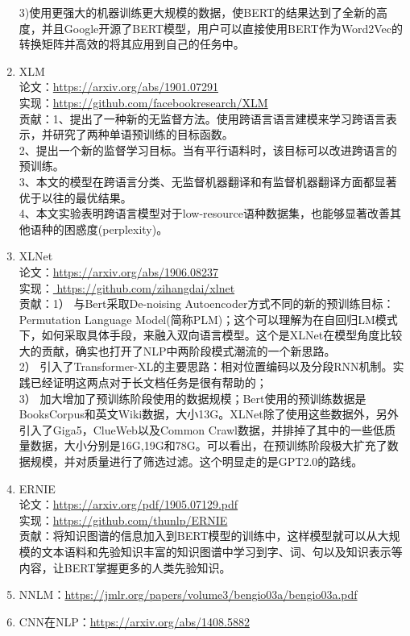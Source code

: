 \documentclass[lang=cn,11pt,a4paper]{elegant_template}
\begin{document}
\begin{enumerate}
    3)使用更强大的机器训练更大规模的数据，使BERT的结果达到了全新的高度，并且Google开源了BERT模型，用户可以直接使用BERT作为Word2Vec的转换矩阵并高效的将其应用到自己的任务中。
    \item XLM \\
    论文：\href{https://arxiv.org/abs/1901.07291}{https://arxiv.org/abs/1901.07291}  \\
    实现：\href{https://github.com/facebookresearch/XLM}{https://github.com/facebookresearch/XLM}  \\
    贡献：1、提出了一种新的无监督方法。使用跨语言语言建模来学习跨语言表示，并研究了两种单语预训练的目标函数。\\
    2、提出一个新的监督学习目标。当有平行语料时，该目标可以改进跨语言的预训练。\\
    3、本文的模型在跨语言分类、无监督机器翻译和有监督机器翻译方面都显著优于以往的最优结果。\\
    4、本文实验表明跨语言模型对于low-resource语种数据集，也能够显著改善其他语种的困惑度(perplexity)。
    \item XLNet \\
    论文：\href{https://arxiv.org/abs/1906.08237}{https://arxiv.org/abs/1906.08237}  \\
    实现：\href{ https://github.com/zihangdai/xlnet}{ https://github.com/zihangdai/xlnet} \\
    贡献：1） 与Bert采取De-noising Autoencoder方式不同的新的预训练目标：Permutation Language Model(简称PLM)；这个可以理解为在自回归LM模式下，如何采取具体手段，来融入双向语言模型。这个是XLNet在模型角度比较大的贡献，确实也打开了NLP中两阶段模式潮流的一个新思路。\\
    2） 引入了Transformer-XL的主要思路：相对位置编码以及分段RNN机制。实践已经证明这两点对于长文档任务是很有帮助的；\\
    3） 加大增加了预训练阶段使用的数据规模；Bert使用的预训练数据是BooksCorpus和英文Wiki数据，大小13G。XLNet除了使用这些数据外，另外引入了Giga5，ClueWeb以及Common Crawl数据，并排掉了其中的一些低质量数据，大小分别是16G,19G和78G。可以看出，在预训练阶段极大扩充了数据规模，并对质量进行了筛选过滤。这个明显走的是GPT2.0的路线。
    \item ERNIE \\
    论文：\href{https://arxiv.org/pdf/1905.07129.pdf}{https://arxiv.org/pdf/1905.07129.pdf}  \\
    实现：\href{https://github.com/thunlp/ERNIE}{https://github.com/thunlp/ERNIE}  \\
    贡献：将知识图谱的信息加入到BERT模型的训练中，这样模型就可以从大规模的文本语料和先验知识丰富的知识图谱中学习到字、词、句以及知识表示等内容，让BERT掌握更多的人类先验知识。
    \item NNLM：\href{https://jmlr.org/papers/volume3/bengio03a/bengio03a.pdf}{https://jmlr.org/papers/volume3/bengio03a/bengio03a.pdf} 
	\item CNN在NLP：\href{https://arxiv.org/abs/1408.5882}{https://arxiv.org/abs/1408.5882}  
\end{enumerate}
\end{document}
